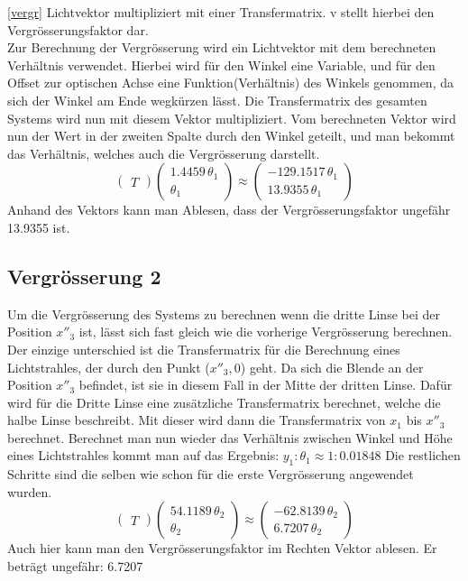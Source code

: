 \documentclass[11pt,twoside,a4paper]{article}
\begin{document}
	\ref{vergr} Lichtvektor multipliziert mit einer Transfermatrix. v stellt hierbei den Vergrösserungsfaktor dar.  \\
	Zur Berechnung der Vergrösserung wird ein Lichtvektor mit dem berechneten Verhältnis verwendet. Hierbei wird für den Winkel eine Variable, und für den Offset zur optischen Achse eine Funktion(Verhältnis) des Winkels genommen, da sich der Winkel am Ende wegkürzen lässt. Die Transfermatrix des gesamten Systems wird nun mit diesem Vektor multipliziert. Vom berechneten Vektor wird nun der Wert in der zweiten Spalte durch den Winkel geteilt, und man bekommt das Verhältnis, welches auch die Vergrösserung darstellt.
	\begin{equation}
	\begin{pmatrix}
	T
	\end{pmatrix}
	\begin{pmatrix}
	1.4459\,\theta_1 \\
	\theta_1 
	\end{pmatrix}
	\approx
	\begin{pmatrix}
	-129.1517\,\theta_1 \\
	13.9355\,\theta_1
	\end{pmatrix}
	\end{equation}
	Anhand des Vektors kann man Ablesen, dass der Vergrösserungsfaktor ungefähr 13.9355 ist.
	\subsection{Vergrösserung 2}
	Um die Vergrösserung des Systems zu berechnen wenn die dritte Linse bei der Position \(x''_{3}\) ist, lässt sich fast gleich wie die vorherige Vergrösserung berechnen. Der einzige unterschied ist die Transfermatrix für die Berechnung eines Lichtstrahles, der durch den Punkt (\(x''_{3},0\)) geht. Da sich die Blende an der Position \(x''_{3}\) befindet, ist sie in diesem Fall in der Mitte der dritten Linse. Dafür wird für die Dritte Linse eine zusätzliche Transfermatrix berechnet, welche die halbe Linse beschreibt. Mit dieser wird dann die Transfermatrix von \(x_{1}\) bis \(x''_{3}\) berechnet. Berechnet man nun wieder das Verhältnis zwischen Winkel und Höhe eines Lichtstrahles kommt man auf das Ergebnis: \(y_{1} : \theta_{1} \approx 1:0.01848\) Die restlichen Schritte sind die selben wie schon für die erste Vergrösserung angewendet wurden.
		\begin{equation}
	\begin{pmatrix}
	T
	\end{pmatrix}
	\begin{pmatrix}
	54.1189\,\theta_2 \\
	\theta_2  
	\end{pmatrix}
	\approx
	\begin{pmatrix}
	-62.8139\,\theta_2 \\
	6.7207\,\theta_2
	\end{pmatrix}
	\end{equation}
	Auch hier kann man den Vergrösserungsfaktor im Rechten Vektor ablesen. Er beträgt ungefähr: 6.7207
\end{document}
